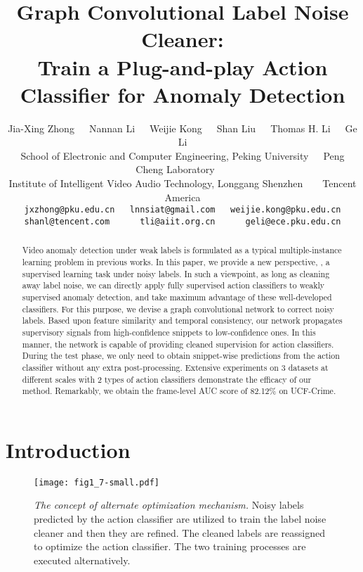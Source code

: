 \documentclass[10pt,twocolumn,letterpaper]{article}
\begin{document}
\title{Graph Convolutional Label Noise Cleaner:\\Train a Plug-and-play Action Classifier for Anomaly Detection}
\author{Jia-Xing Zhong~~~Nannan Li~~~Weijie Kong~~~Shan Liu~~~Thomas H. Li~~~{Ge Li \footnotesize{\Letter}}\\
	School of Electronic and Computer Engineering, Peking University~~~Peng Cheng Laboratory~~~\\
	Institute of Intelligent Video Audio Technology, Longgang Shenzhen~~~~Tencent America\\
	{\tt\small jxzhong@pku.edu.cn~~~lnnsiat@gmail.com~~~weijie.kong@pku.edu.cn}\\ 	{\tt\small shanl@tencent.com~~~~~~tli@aiit.org.cn~~~~~~geli@ece.pku.edu.cn}
}

\maketitle


\begin{abstract}
Video anomaly detection under weak labels is formulated as a typical multiple-instance learning problem in previous works. In this paper, we provide a new perspective, \ie, a supervised learning task under noisy labels. In such a viewpoint, as long as cleaning away label noise, we can directly apply fully supervised action classifiers to weakly supervised anomaly detection, and take maximum advantage of these well-developed classifiers. For this purpose, we devise a graph convolutional network to correct noisy labels. Based upon feature similarity and temporal consistency, our network propagates supervisory signals from high-confidence snippets to low-confidence ones. In this manner, the network is capable of providing cleaned supervision for action classifiers. During the test phase, we only need to obtain snippet-wise predictions from the action classifier without any extra post-processing. Extensive experiments on 3 datasets at different scales with 2 types of action classifiers demonstrate the efficacy of our method. Remarkably, we obtain the frame-level AUC score of 82.12\% on UCF-Crime.
\end{abstract}

\section{Introduction}
\begin{figure}[ht]
\centering
\texttt{[image: fig1\_7-small.pdf]}
\caption{\emph{The concept of alternate optimization mechanism.} Noisy labels predicted by the action classifier are utilized to train the label noise cleaner and then they are refined. The cleaned labels are reassigned to optimize the action classifier. The two training processes are executed alternatively.}
\label{fig:EM-Framework}
\end{figure}
\end{document}
